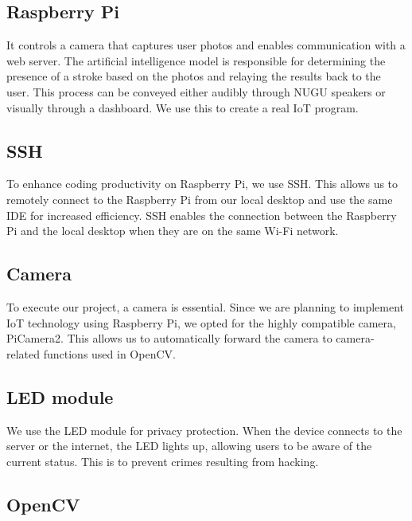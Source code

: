 \subsection{\textbf{Raspberry Pi}}
It controls a camera that captures user photos and enables communication with a web server. The artificial intelligence model is responsible for determining the presence of a stroke based on the photos and relaying the results back to the user. This process can be conveyed either audibly through NUGU speakers or visually through a dashboard. We use this to create a real IoT program.\\

\subsection{\textbf{SSH}}
To enhance coding productivity on Raspberry Pi, we use SSH. This allows us to remotely connect to the Raspberry Pi from our local desktop and use the same IDE for increased efficiency.
SSH enables the connection between the Raspberry Pi and the local desktop when they are on the same Wi-Fi network.\\

\subsection{\textbf{Camera}}
To execute our project, a camera is essential. Since we are planning to implement IoT technology using Raspberry Pi, we opted for the highly compatible camera, PiCamera2. This allows us to automatically forward the camera to camera-related functions used in OpenCV.\\

\subsection{\textbf{LED module}}
We use the LED module for privacy protection. When the device connects to the server or the internet, the LED lights up, allowing users to be aware of the current status. This is to prevent crimes resulting from hacking.\\

\subsection{\textbf{OpenCV}}

